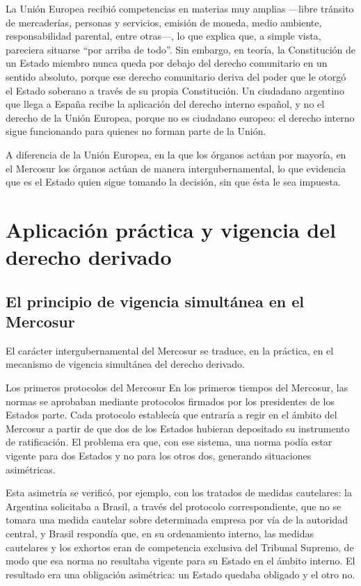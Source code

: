\documentclass[12pt,oneside]{book}
\begin{document}
La Unión Europea recibió competencias en materias muy amplias —libre tránsito de mercaderías, personas y servicios, emisión de moneda, medio ambiente, responsabilidad parental, entre otras—, lo que explica que, a simple vista, pareciera situarse ``por arriba de todo''. Sin embargo, en teoría, la Constitución de un Estado miembro nunca queda por debajo del derecho comunitario en un sentido absoluto, porque ese derecho comunitario deriva del poder que le otorgó el Estado soberano a través de su propia Constitución. Un ciudadano argentino que llega a España recibe la aplicación del derecho interno español, y no el derecho de la Unión Europea, porque no es ciudadano europeo: el derecho interno sigue funcionando para quienes no forman parte de la Unión.

A diferencia de la Unión Europea, en la que los órganos actúan por mayoría, en el Mercosur los órganos actúan de manera intergubernamental, lo que evidencia que es el Estado quien sigue tomando la decisión, sin que ésta le sea impuesta.

\section{Aplicación práctica y vigencia del derecho derivado}

\subsection{El principio de vigencia simultánea en el Mercosur}

El carácter intergubernamental del Mercosur se traduce, en la práctica, en el mecanismo de vigencia simultánea del derecho derivado.

\begin{example}{Los primeros protocolos del Mercosur}
En los primeros tiempos del Mercosur, las normas se aprobaban mediante protocolos firmados por los presidentes de los Estados parte. Cada protocolo establecía que entraría a regir en el ámbito del Mercosur a partir de que dos de los Estados hubieran depositado su instrumento de ratificación. El problema era que, con ese sistema, una norma podía estar vigente para dos Estados y no para los otros dos, generando situaciones asimétricas.

Esta asimetría se verificó, por ejemplo, con los tratados de medidas cautelares: la Argentina solicitaba a Brasil, a través del protocolo correspondiente, que no se tomara una medida cautelar sobre determinada empresa por vía de la autoridad central, y Brasil respondía que, en su ordenamiento interno, las medidas cautelares y los exhortos eran de competencia exclusiva del Tribunal Supremo, de modo que esa norma no resultaba vigente para su Estado en el ámbito interno. El resultado era una obligación asimétrica: un Estado quedaba obligado y el otro no.
\end{example}
\end{document}

